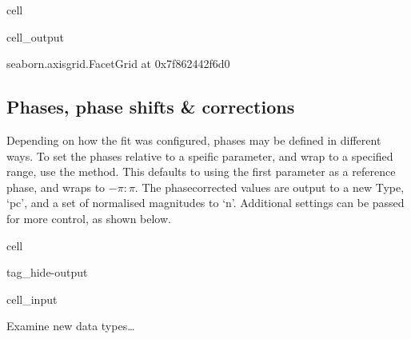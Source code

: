 \documentclass[letterpaper,table,10pt,english]{jupyterBook}
\begin{document}
\begin{sphinxuseclass}{cell}
\begin{sphinxVerbatimOutput}
\begin{sphinxuseclass}{cell_output}
\begin{sphinxVerbatim}[commandchars=\\\{\}]
\PYGZlt{}seaborn.axisgrid.FacetGrid at 0x7f862442f6d0\PYGZgt{}
\end{sphinxVerbatim}

\noindent{}

\end{sphinxuseclass}\end{sphinxVerbatimOutput}

\end{sphinxuseclass}

\subsection{Phases, phase shifts \& corrections}
\label{\detokenize{part2/case-study-N2_290723:phases-phase-shifts-corrections}}
\sphinxAtStartPar
Depending on how the fit was configured, phases may be defined in different ways. To set the phases relative to a speific parameter, and wrap to a specified range, use the  method. This defaults to using the first parameter as a reference phase, and wraps to \(-\pi:\pi\). The phase\sphinxhyphen{}corrected values are output to a new Type, ‘pc’, and a set of normalised magnitudes to ‘n’. Additional settings can be passed for more control, as shown below.

\begin{sphinxuseclass}{cell}
\begin{sphinxuseclass}{tag_hide-output}\begin{sphinxVerbatimInput}

\begin{sphinxuseclass}{cell_input}
\begin{sphinxVerbatim}[commandchars=\\\{\}]
 
\end{sphinxVerbatim}

\end{sphinxuseclass}\end{sphinxVerbatimInput}

\end{sphinxuseclass}
\end{sphinxuseclass}
\sphinxAtStartPar
Examine new data types…
\end{document}
